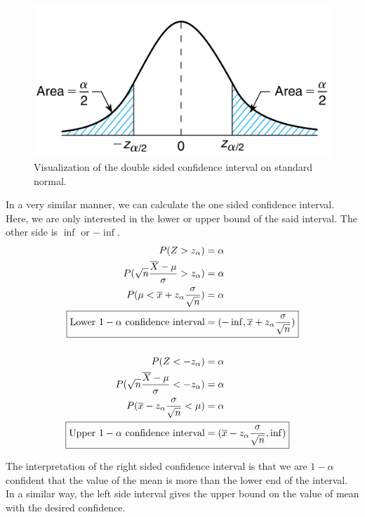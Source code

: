 \documentclass[../probability-notes.tex]{subfiles}
\begin{document}
    \begin{figure}[h]
    \includegraphics[scale=0.4]{../images/conf_1}
    \centering
    \caption{Visualization of the double sided confidence interval on standard normal.}
    \label{fig:conf_1} %
    \end{figure}

    In a very similar manner, we can calculate the one sided confidence interval. Here, we are only interested in the lower or upper bound of the said interval. The other side is $\inf$ or $-\inf$.
    \begin{align*}
        P(Z > z_{\alpha}) &= \alpha\\
        P(\sqrt{n}\frac{\overline{X} - \mu}{\sigma} > z_{\alpha}) &= \alpha\\
        P(\mu < \overline{x} + z_{\alpha}\frac{\sigma}{\sqrt{n}}) &= \alpha\\
        \Aboxed{\text{Lower $1-\alpha$ confidence interval} &= (-\inf, \overline{x} + z_{\alpha}\frac{\sigma}{\sqrt{n}})}\\
        \\
        P(Z < -z_{\alpha}) &= \alpha\\
        P(\sqrt{n}\frac{\overline{X} - \mu}{\sigma} < -z_{\alpha}) &= \alpha\\
        P(\overline{x} - z_{\alpha}\frac{\sigma}{\sqrt{n}} < \mu) &= \alpha\\
        \Aboxed{\text{Upper $1-\alpha$ confidence interval} &= (\overline{x} - z_{\alpha}\frac{\sigma}{\sqrt{n}}, \inf)}
    \end{align*}

    The interpretation of the right sided confidence interval is that we are $1-\alpha$ confident that the value of the mean is more than the lower end of the interval. In a similar way, the left side interval gives the upper bound on the value of mean with the desired confidence.
\end{document}
